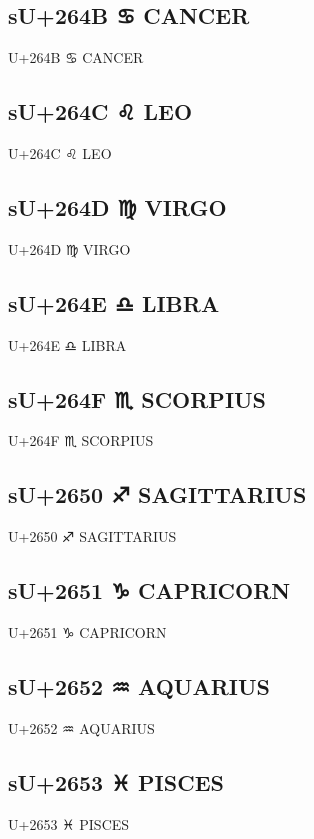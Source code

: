 \subsection{sU+264B ♋ CANCER}

U+264B ♋ CANCER

\subsection{sU+264C ♌ LEO}

U+264C ♌ LEO

\subsection{sU+264D ♍ VIRGO}

U+264D ♍ VIRGO

\subsection{sU+264E ♎ LIBRA}

U+264E ♎ LIBRA

\subsection{sU+264F ♏ SCORPIUS}

U+264F ♏ SCORPIUS

\subsection{sU+2650 ♐ SAGITTARIUS}

U+2650 ♐ SAGITTARIUS

\subsection{sU+2651 ♑ CAPRICORN}

U+2651 ♑ CAPRICORN

\subsection{sU+2652 ♒ AQUARIUS}

U+2652 ♒ AQUARIUS

\subsection{sU+2653 ♓ PISCES}

U+2653 ♓ PISCES

